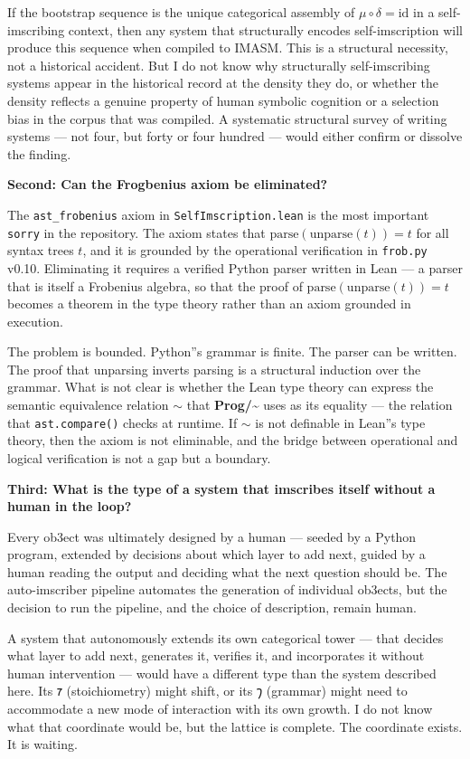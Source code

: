 \documentclass[12pt,a4paper]{article}
\begin{document}
If the bootstrap sequence is the unique categorical assembly of $\mu\circ\delta = \mathrm{id}$ in a self-imscribing context, then any system that structurally encodes self-imscription will produce this sequence when compiled to IMASM. This is a structural necessity, not a historical accident. But I do not know why structurally self-imscribing systems appear in the historical record at the density they do, or whether the density reflects a genuine property of human symbolic cognition or a selection bias in the corpus that was compiled. A systematic structural survey of writing systems --- not four, but forty or four hundred --- would either confirm or dissolve the finding.

\textbf{Second: Can the Frogbenius axiom be eliminated?}

The \texttt{ast\_frobenius} axiom in \texttt{SelfImscription.lean} is the most important \texttt{sorry} in the repository. The axiom states that $\text{parse}(\text{unparse}(t)) = t$ for all syntax trees $t$, and it is grounded by the operational verification in \texttt{frob.py} v0.10. Eliminating it requires a verified Python parser written in Lean --- a parser that is itself a Frobenius algebra, so that the proof of $\text{parse}(\text{unparse}(t)) = t$ becomes a theorem in the type theory rather than an axiom grounded in execution.

The problem is bounded. Python''s grammar is finite. The parser can be written. The proof that unparsing inverts parsing is a structural induction over the grammar. What is not clear is whether the Lean type theory can express the semantic equivalence relation $\sim$ that \textbf{Prog/\textasciitilde{}} uses as its equality --- the relation that \texttt{ast.compare()} checks at runtime. If $\sim$ is not definable in Lean''s type theory, then the axiom is not eliminable, and the bridge between operational and logical verification is not a gap but a boundary.

\textbf{Third: What is the type of a system that imscribes itself without a human in the loop?}

Every ob3ect was ultimately designed by a human --- seeded by a Python program, extended by decisions about which layer to add next, guided by a human reading the output and deciding what the next question should be. The auto-imscriber pipeline automates the generation of individual ob3ects, but the decision to run the pipeline, and the choice of description, remain human.

A system that autonomously extends its own categorical tower --- that decides what layer to add next, generates it, verifies it, and incorporates it without human intervention --- would have a different type than the system described here. Its $\text{𐑳}$ (stoichiometry) might shift, or its $\text{𐑠}$ (grammar) might need to accommodate a new mode of interaction with its own growth. I do not know what that coordinate would be, but the lattice is complete. The coordinate exists. It is waiting.
\end{document}
